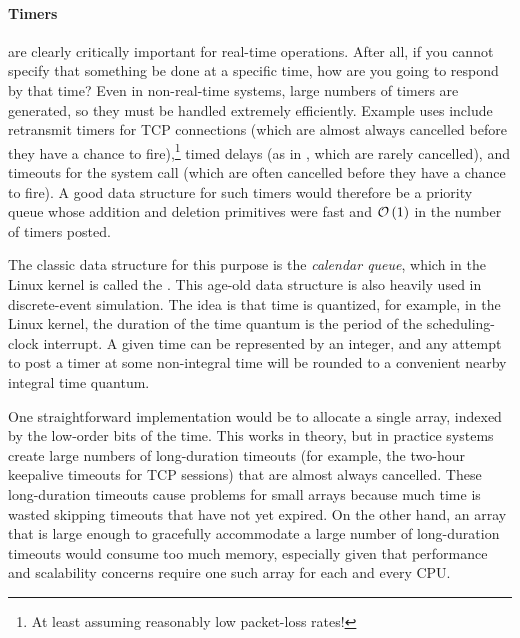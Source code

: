 \paragraph{Timers} are clearly critically important for real-time
operations.
After all, if you cannot specify that something be done at a specific
time, how are you going to respond by that time?
Even in non-real-time systems, large numbers of timers are generated,
so they must be handled extremely efficiently.
Example uses include retransmit timers for TCP connections (which are
almost always cancelled before they have a chance to fire),\footnote{
	At least assuming reasonably low packet-loss rates!}
timed delays (as in , which are rarely cancelled),
and timeouts for the  system call (which are often
cancelled before they have a chance to fire).
A good data structure for such timers would therefore be a priority queue
whose addition and deletion primitives were fast and $\mathcal{O}\left(1\right)$ in the number
of timers posted.

The classic data structure for this purpose is the \emph{calendar queue},
which in the Linux kernel is called the .
This age-old data structure is also heavily used in discrete-event
simulation.
The idea is that time is quantized, for example, in the Linux kernel,
the duration of the time quantum is the period of the scheduling-clock
interrupt.
A given time can be represented by an integer, and any attempt to post
a timer at some non-integral time will be rounded to a convenient nearby
integral time quantum.

One straightforward implementation would be to allocate a single array,
indexed by the low-order bits of the time.
This works in theory, but in practice systems create large numbers of
long-duration timeouts (for example, the two-hour keepalive timeouts for TCP
sessions) that are almost always cancelled.
These long-duration timeouts cause problems for small arrays because
much time is wasted skipping timeouts that have not yet expired.
On the other hand, an array that is large enough to gracefully accommodate
a large number of long-duration timeouts would consume too much memory,
especially given that performance and scalability concerns require one
such array for each and every CPU.

